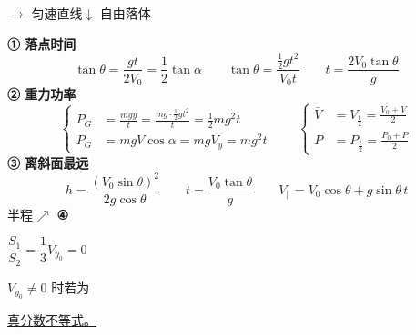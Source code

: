 \noindent $\rightarrow$ 匀速直线\quad $\downarrow$ 自由落体

\noindent {}

\noindent {}

\noindent {}%
\textbf{① 落点时间}
\[
\tan\theta=\frac{gt}{2V_0}=\frac12\tan\alpha\qquad
\tan\theta=\frac{\frac12gt^2}{V_0t}\qquad
t=\frac{2V_0\tan\theta}{g}
\]
\textbf{② 重力功率}
\[
\left\{\begin{aligned}
\bar P_G&=\frac{mgy}{t}=\frac{mg\cdot\frac12gt^2}{t}=\frac12mg^2t\\
P_G&=mgV\cos\alpha=mgV_y=mg^2t
\end{aligned}\right.
\qquad
\left\{\begin{aligned}
\bar V&=V_{\frac t2}=\frac{V_0+V}{2}\\
\bar P&=P_{\frac t2}=\frac{P_0+P}{2}
\end{aligned}\right.
\]%
\textbf{③ 离斜面最远}
\[
h=\frac{(V_0\sin\theta)^2}{2g\cos\theta}\qquad
t=\frac{V_0\tan\theta}{g}\qquad
V_{\parallel}=V_0\cos\theta+g\sin\theta\,t
\]
\noindent 半程$\nearrow$%
\textbf{④}

\noindent $\dfrac{S_1}{S_2}=\dfrac13$\qquad $V_{y_0}=0$

\noindent $V_{y_0}\neq0$ 时\quad 若为

\noindent \underline{真分数不等式。}%

